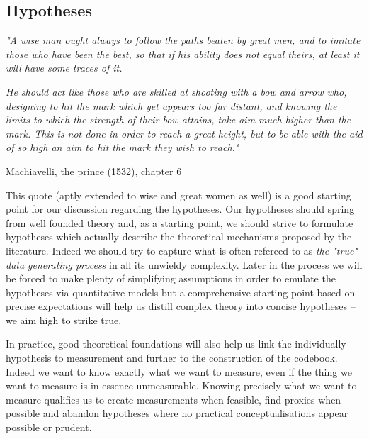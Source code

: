 \documentclass[a4paper]{article}
\begin{document}
\subsection{Hypotheses}

\begin{displayquote}
\emph{"A wise man ought always to follow the paths beaten by great men, and to imitate those who have been the best, so that if his ability does not equal theirs, at least it will have some traces of it.}

\emph{He should act like those who are skilled at shooting with a bow and arrow who, designing to hit the mark which yet appears too far distant, and knowing the limits to which the strength of their bow attains, take aim much higher than the mark. This is not done in order to reach a great height, but to be able with the aid of so high an aim to hit the mark they wish to reach."}\par

\hfill \hfill Machiavelli, the prince (1532), chapter 6 %
\end{displayquote}

This quote (aptly extended to wise and great women as well) is a good starting point for our discussion regarding the hypotheses. Our hypotheses should spring from well founded theory and, as a starting point, we should strive to formulate hypotheses which actually describe the theoretical mechanisms proposed by the literature. Indeed we should try to capture what is often refereed to as \emph{the "true" data generating process} in all its unwieldy complexity. Later in the process we will be forced to make plenty of simplifying assumptions in order to emulate the hypotheses via quantitative models but a comprehensive starting point based on precise expectations will help us distill complex theory into concise hypotheses -- we aim high to strike true.\par

In practice, good theoretical foundations will also help us link the individually hypothesis to measurement and further to the construction of the codebook. Indeed we want to know exactly what we want to measure, even if the thing we want to measure is in essence unmeasurable. Knowing precisely what we want to measure qualifies us to create measurements when feasible, find proxies when possible and abandon hypotheses where no practical conceptualisations appear possible or prudent.\par
 
\end{document}
